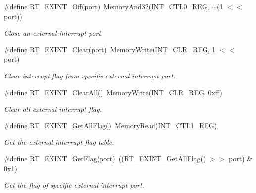 \begin{DoxyCompactItemize}
\#define \mbox{\hyperlink{a00011_aa1a62e0954243f0c0fc8ec850ea2eebe}{R\+T\+\_\+\+E\+X\+I\+N\+T\+\_\+\+Off}}(port)~\mbox{\hyperlink{a00020_ad87cedffcaadc51db22594fce55173d4}{Memory\+And32}}(\mbox{\hyperlink{a00020_adadaa0ab1ebbd7ba9b70dfd24c3ed44da417bb62509b1343f4685a023c8ec4b09}{I\+N\+T\+\_\+\+C\+T\+L0\+\_\+\+R\+EG}}, $\sim$(1 $<$$<$ port))
\begin{DoxyCompactList}\small\item\em Close an external interrupt port. \end{DoxyCompactList}\item 
\#define \mbox{\hyperlink{a00011_a1bebef46f3eb19ed0c71deb174a4bbaf}{R\+T\+\_\+\+E\+X\+I\+N\+T\+\_\+\+Clear}}(port)~Memory\+Write(\mbox{\hyperlink{a00020_adadaa0ab1ebbd7ba9b70dfd24c3ed44da33cabaff7369092ec0e29dd2ffb0cb3d}{I\+N\+T\+\_\+\+C\+L\+R\+\_\+\+R\+EG}}, 1 $<$$<$ port)
\begin{DoxyCompactList}\small\item\em Clear interrupt flag from specific external interrupt port. \end{DoxyCompactList}\item 
\#define \mbox{\hyperlink{a00011_a4f2cc857d9a0da5f06bbf5ff62babbdb}{R\+T\+\_\+\+E\+X\+I\+N\+T\+\_\+\+Clear\+All}}()~Memory\+Write(\mbox{\hyperlink{a00020_adadaa0ab1ebbd7ba9b70dfd24c3ed44da33cabaff7369092ec0e29dd2ffb0cb3d}{I\+N\+T\+\_\+\+C\+L\+R\+\_\+\+R\+EG}}, 0xff)
\begin{DoxyCompactList}\small\item\em Clear all external interrupt flag. \end{DoxyCompactList}\item 
\#define \mbox{\hyperlink{a00011_ab8287fc872a2d0ae785c8b3b51a37a5e}{R\+T\+\_\+\+E\+X\+I\+N\+T\+\_\+\+Get\+All\+Flag}}()~Memory\+Read(\mbox{\hyperlink{a00020_adadaa0ab1ebbd7ba9b70dfd24c3ed44dabc5f0d33bb47527f3d8a9c20250d5c5b}{I\+N\+T\+\_\+\+C\+T\+L1\+\_\+\+R\+EG}})
\begin{DoxyCompactList}\small\item\em Get the external interrupt flag table. \end{DoxyCompactList}\item 
\#define \mbox{\hyperlink{a00011_ae65409aaf69a9f495207ebbe133f161d}{R\+T\+\_\+\+E\+X\+I\+N\+T\+\_\+\+Get\+Flag}}(port)~((\mbox{\hyperlink{a00011_ab8287fc872a2d0ae785c8b3b51a37a5e}{R\+T\+\_\+\+E\+X\+I\+N\+T\+\_\+\+Get\+All\+Flag}}() $>$$>$ port) \& 0x1)
\begin{DoxyCompactList}\small\item\em Get the flag of specific external interrupt port. \end{DoxyCompactList}\end{DoxyCompactItemize}


